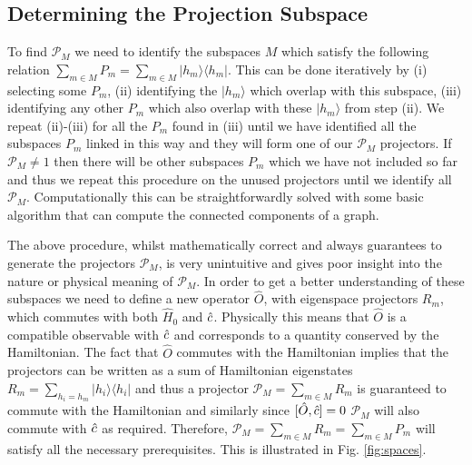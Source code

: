 \subsection{Determining the Projection Subspace}

To find $\mathcal{P}_M$ we need to identify the subspaces $M$ which
satisfy the following relation
$\sum_{m \in M} P_m = \sum_{m \in M} | h_m \rangle \langle h_m
|$. This can be done iteratively by (i) selecting some $P_m$, (ii)
identifying the $| h_m \rangle$ which overlap with this subspace,
(iii) identifying any other $P_m$ which also overlap with these
$| h_m \rangle$ from step (ii). We repeat (ii)-(iii) for all the $P_m$
found in (iii) until we have identified all the subspaces $P_m$ linked
in this way and they will form one of our $\mathcal{P}_M$
projectors. If $\mathcal{P}_M \ne 1$ then there will be other
subspaces $P_m$ which we have not included so far and thus we repeat
this procedure on the unused projectors until we identify all
$\mathcal{P}_M$. Computationally this can be straightforwardly solved
with some basic algorithm that can compute the connected components of
a graph.

The above procedure, whilst mathematically correct and always
guarantees to generate the projectors $\mathcal{P}_M$, is very
unintuitive and gives poor insight into the nature or physical meaning
of $\mathcal{P}_M$. In order to get a better understanding of these
subspaces we need to define a new operator $\hat{O}$, with eigenspace
projectors $R_m$, which commutes with both $\hat{H}_0$ and
$\hat{c}$. Physically this means that $\hat{O}$ is a compatible observable
with $\hat{c}$ and corresponds to a quantity conserved by the
Hamiltonian. The fact that $\hat{O}$ commutes with the Hamiltonian
implies that the projectors can be written as a sum of Hamiltonian
eigenstates $R_m = \sum_{h_i = h_m} | h_i \rangle \langle h_i |$ and
thus a projector $\mathcal{P}_M = \sum_{m \in M} R_m$ is guaranteed to
commute with the Hamiltonian and similarly since $[\hat{O}, \hat{c}] = 0$
$\mathcal{P}_M$ will also commute with $\hat{c}$ as required. Therefore,
$\mathcal{P}_M = \sum_{m \in M} R_m = \sum_{m \in M} P_m$ will satisfy
all the necessary prerequisites. This is illustrated in
Fig. \ref{fig:spaces}.

